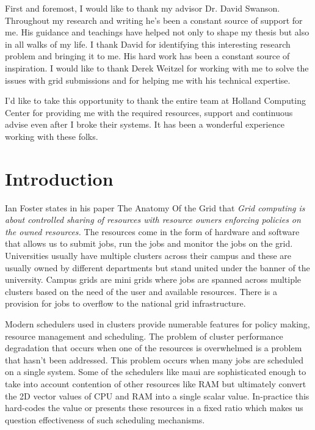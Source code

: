 \documentclass[ms,electronic,double]{nuthesis}
\begin{document}

\begin{acknowledgments}

First and foremost, I would like to thank my advisor Dr. David Swanson. Throughout my research
and writing he's been a constant source of support for me. His guidance and teachings have helped not 
only to shape my thesis but also in all walks of my life. I thank David for identifying this interesting
research problem and bringing it to me. His hard work has been a constant source of inspiration.
 I would like to thank Derek Weitzel for working with me to solve the 
 issues with grid submissions and for helping me with his technical expertise.
 
 I'd like to take this opportunity to thank the entire team at Holland 
Computing Center for providing me with the required resources, support and continuous advise
 even after I broke their systems. It has been a wonderful experience 
 working with these folks.
 
\end{acknowledgments}

\tableofcontents
\newpage
\listoffigures


\mainmatter

\chapter{Introduction}
Ian Foster states in his paper The Anatomy Of the Grid \cite{Foster:2001:AGE:1080644.1080667} that 
\emph{Grid computing is about controlled sharing of resources with resource owners enforcing policies 
on the owned resources.} The resources come in the form of hardware 
and software that allows us to submit jobs, run the jobs and monitor the jobs on the grid. 
Universities usually have multiple clusters across their campus and these are 
usually owned by different departments but stand united under the banner of the university.
Campus grids are mini grids where jobs are spanned across multiple clusters
 based on the need of the user and available resources. There is a provision for jobs to overflow to the national
grid infrastructure\cite{derekThesis}.

Modern schedulers used in clusters provide numerable features for policy making, resource management 
and scheduling. The problem of cluster 
performance degradation that occurs when one of the resources is overwhelmed is a problem that hasn't been 
addressed. This problem occurs when many jobs are scheduled on a single system. Some of 
the schedulers like maui \cite{pbstorque} are sophisticated enough to take into account contention of other 
resources like RAM but ultimately convert the 2D vector values of CPU and RAM 
into a single scalar value. In-practice this hard-codes the value or presents these resources
in a fixed ratio which makes us question effectiveness of such scheduling mechanisms. 
\end{document}
